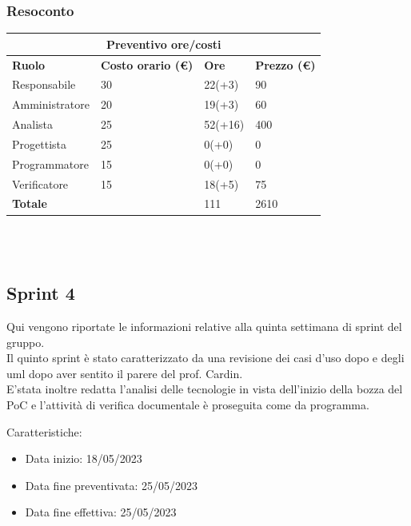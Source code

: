 \documentclass[12pt]{article}
\begin{document}
\subsubsection{Resoconto}
\begin{center}
	\begin{tabularx}{\textwidth}{|X|X|X|X|}
		\hline
		\multicolumn{4}{|c|}{\textbf{Preventivo ore/costi}}                                      \\
		\hline
		\hline
		\textbf{Ruolo}  & \textbf{Costo orario (\euro)} & \textbf{Ore} & \textbf{Prezzo (\euro)} \\
		\hline
		Responsabile    & 30                            & 22(+3)       & 90                      \\
		\hline
		Amministratore  & 20                            & 19(+3)       & 60                      \\
		\hline
		Analista        & 25                            & 52(+16)      & 400                     \\
		\hline
		Progettista     & 25                            & 0(+0)        & 0                       \\
		\hline
		Programmatore   & 15                            & 0(+0)        & 0                       \\
		\hline
		Verificatore    & 15                            & 18(+5)       & 75                      \\
		\hline
		\hline
		\textbf{Totale} &                               & 111          & 2610                    \\
		\hline
	\end{tabularx}\\[8pt]
	\mbox{}\\
\end{center}

\subsection{Sprint 4}
Qui vengono riportate le informazioni relative alla quinta settimana di sprint del gruppo. \\
Il quinto sprint è stato caratterizzato da una revisione dei casi d'uso dopo e degli uml dopo aver sentito il parere del prof. Cardin.\\
E'stata inoltre redatta l'analisi delle tecnologie in vista dell'inizio della bozza del PoC e l'attività di verifica documentale è proseguita come da programma.


Caratteristiche:
\begin{itemize}
	\item Data inizio: 18/05/2023
	\item Data fine preventivata: 25/05/2023
	\item Data fine effettiva: 25/05/2023
\end{itemize}
\end{document}

